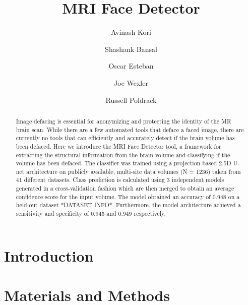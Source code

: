 \documentclass[runningheads]{llncs}
\begin{document}
%
\title{MRI Face Detector}
%
%
\author{%
Avinash Kori\orcidID{} %
\and Shashank Bansal\orcidID{} %
\and Oscar Esteban\orcidID{} %
\and Joe Wexler\orcidID{} %
\and Russell Poldrack\orcidID{}} %
%
%
%
\maketitle              %
%
\begin{abstract}
Image defacing is essential for anonymizing and protecting the identity of the MR brain scan. While there are a few automated tools that deface a faced image, there are currently no tools that can efficiently and accurately detect if the brain volume has been defaced. Here we introduce the MRI Face Detector tool, a framework for extracting the structural information from the brain volume and classifying if the volume has been defaced. The classifier was trained using a projection based 2.5D U-net architecture on publicly available, multi-site data volumes (N = 1236) taken from 41 different datasets. Class prediction is calculated using 3 independent models generated in a cross-validation fashion which are then merged to obtain an average confidence score for the input volume. The model obtained an accuracy of 0.948 on a held-out dataset *DATASET INFO*. Furthermore, the model architecture achieved a sensitivity and specificity of 0.945 and 0.949 respectively.

\keywords{}
\end{abstract}
%
\section{Introduction}


\newpage
\section{Materials and Methods}
\end{document}
